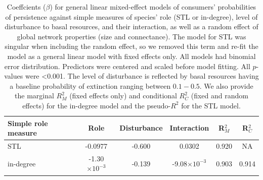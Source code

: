 \documentclass[12pt]{article}
\begin{document}
\begin{spacing}{2.0}
    \begin{table}[hb!]
        \caption{Coeffcients ($\beta$) for general linear mixed-effect models of consumers' probabilities of persistence against simple measures of species' role (STL or in-degree), level of disturbance to basal resources, and their interaction, as well as a random effect of global network properties (size and connectance). The model for STL was singular when including the random effect, so we removed this term and re-fit the model as a general linear model with fixed effects only. All models had binomial error distribution. Predictors were centered and scaled before model fitting. All $p$-values were \textless0.001. The level of disturbance is reflected by basal resources having a baseline probability of extinction ranging between $0.1 - 0.5$.  We also provide the marginal $R^2_M$ (fixed effects only) and conditional $R^2_C$ (fixed and random effects) for the in-degree model and the pseudo-$R^2$ for the STL model.}
        \label{tab:per_vs_TLdeg}
        \centering
        \begin{tabular}{l|c  c  c | c c  }
            Simple role measure & Role & Disturbance & Interaction & R$^2_M$ & R$^2_C$ \\
            \hline
            STL & -0.0977 & -0.600 & 0.0302 & 0.920 & NA \\
            in-degree & -1.30$\times10^{-3}$ & -0.139 & -9.08$\times10^{-3}$ & 0.903 & 0.914 \\
        \end{tabular}
    \end{table}






\end{spacing}
\end{document}
